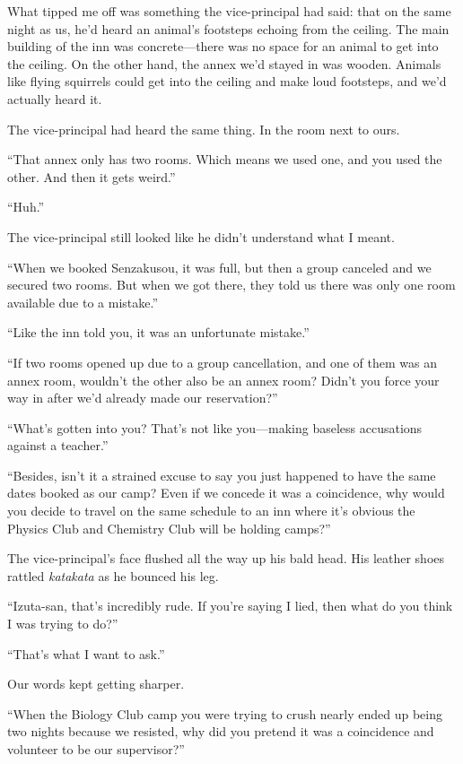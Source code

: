 \documentclass[
    a4paper,
    12pt,
    twoside,
    openany,
    UTF8,
    fontset=windows
]{ctexbook}
\begin{document}
What tipped me off was something the vice-principal had said: that on the same night as us, he'd heard an animal's footsteps echoing from the ceiling. The main building of the inn was concrete---there was no space for an animal to get into the ceiling. On the other hand, the annex we'd stayed in was wooden. Animals like flying squirrels could get into the ceiling and make loud footsteps, and we'd actually heard it.

The vice-principal had heard the same thing. In the room next to ours.

``That annex only has two rooms. Which means we used one, and you used the other. And then it gets weird.''

``Huh.''

The vice-principal still looked like he didn't understand what I meant.

``When we booked Senzakusou, it was full, but then a group canceled and we secured two rooms. But when we got there, they told us there was only one room available due to a mistake.''

``Like the inn told you, it was an unfortunate mistake.''

``If two rooms opened up due to a group cancellation, and one of them was an annex room, wouldn't the other also be an annex room? Didn't you force your way in after we'd already made our reservation?''

``What's gotten into you? That's not like you---making baseless accusations against a teacher.''

``Besides, isn't it a strained excuse to say you just happened to have the same dates booked as our camp? Even if we concede it was a coincidence, why would you decide to travel on the same schedule to an inn where it's obvious the Physics Club and Chemistry Club will be holding camps?''

The vice-principal's face flushed all the way up his bald head. His leather shoes rattled \textit{katakata} as he bounced his leg.

``Izuta-san, that's incredibly rude. If you're saying I lied, then what do you think I was trying to do?''

``That's what I want to ask.''

Our words kept getting sharper.

``When the Biology Club camp you were trying to crush nearly ended up being two nights because we resisted, why did you pretend it was a coincidence and volunteer to be our supervisor?''
\end{document}
